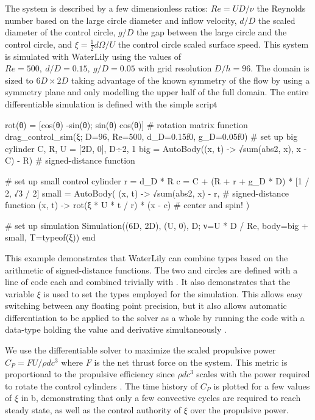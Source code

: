 \documentclass[10pt,a4paper]{article}
\begin{document}
The system is described by a few dimensionless ratios: $Re=UD/\nu$ the Reynolds number based on the large circle diameter and inflow velocity, $d/D$ the scaled diameter of the control circle, $g/D$ the gap between the large circle and the control circle, and $\xi=\frac 12 d\Omega/U$ the control circle scaled surface speed. This system is simulated with WaterLily using the values of $Re=500,\ d/D=0.15,\ g/D=0.05$ with grid resolution $D/h=96$. The domain is sized to $6D\times2D$ taking advantage of the known symmetry of the flow by using a symmetry plane and only modelling the upper half of the full domain. The entire differentiable simulation is defined with the simple script

\begin{minipage}{\linewidth}\noindent
\begin{jllisting}
rot(θ) = [cos(θ) -sin(θ); sin(θ) cos(θ)] # rotation matrix
function drag_control_sim(ξ; D=96, Re=500, d_D=0.15f0, g_D=0.05f0)
    # set up big cylinder
    C, R, U = [2D, 0], D÷2, 1
    big = AutoBody((x, t) -> √sum(abs2, x), x - C) - R) # signed-distance function

    # set up small control cylinder
    r = d_D * R
    c = C + (R + r + g_D * D) * [1 / 2, √3 / 2]
    small = AutoBody(
        (x, t) -> √sum(abs2, x) - r,           # signed-distance function
        (x, t) -> rot(ξ * U * t / r) * (x - c) # center and spin!
    )

    # set up simulation
    Simulation((6D, 2D), (U, 0), D; ν=U * D / Re, body=big + small, T=typeof(ξ))
end
\end{jllisting}
\end{minipage}

This example demonstrates that WaterLily can combine  types based on the arithmetic of signed-distance functions. The two  and  circles are defined with a line of code each and combined trivially with . It also demonstrates that the variable $\xi$ is used to set the types employed for the simulation. This allows easy switching between any floating point precision, but it also allows automatic differentiation to be applied to the solver as a whole by running the code with a  data-type holding the value and derivative simultaneously \citep{RevelsLubinPapamarkou2016}.

We use the differentiable solver to maximize the scaled propulsive power $C_P = FU/\rho dc^3$ where $F$ is the net thrust force on the system. This metric is  proportional to the propulsive efficiency since $\rho dc^3$ scales with the power required to rotate the control cylinders \citep{schulmeister2017}. The time history of $C_P$ is plotted for a few values of $\xi$ in b, demonstrating that only a few convective cycles are required to reach steady state, as well as the control authority of $\xi$ over the propulsive power.
\end{document}

